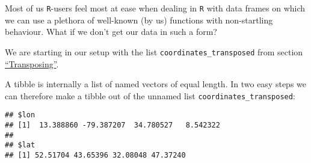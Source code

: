 \documentclass[]{book}
\newenvironment{Shaded}{\begin{snugshade}}{\end{snugshade}}
\newcommand{\DecValTok}[1]{\textcolor[rgb]{0.00,0.00,0.81}{#1}}
\newcommand{\KeywordTok}[1]{\textcolor[rgb]{0.13,0.29,0.53}{\textbf{#1}}}
\newcommand{\NormalTok}[1]{#1}
\newcommand{\OperatorTok}[1]{\textcolor[rgb]{0.81,0.36,0.00}{\textbf{#1}}}
\newcommand{\StringTok}[1]{\textcolor[rgb]{0.31,0.60,0.02}{#1}}
\begin{document}
\begin{Shaded}
\end{Shaded}

Most of us \texttt{R}-users feel most at ease when dealing in \texttt{R} with data frames on which we can use a plethora of well-known (by us) functions with non-startling behaviour.
What if we don't get our data in such a form?

We are starting in our setup with the list \texttt{coordinates\_transposed} from section \protect\hyperlink{transpose}{``Transposing''}.

A tibble is internally a list of named vectors of equal length.
In two easy steps we can therefore make a tibble out of the unnamed list \texttt{coordinates\_transposed}:

\begin{Shaded}
\end{Shaded}

\begin{verbatim}
## $lon
## [1]  13.388860 -79.387207  34.780527   8.542322
## 
## $lat
## [1] 52.51704 43.65396 32.08048 47.37240
\end{verbatim}
\end{document}
